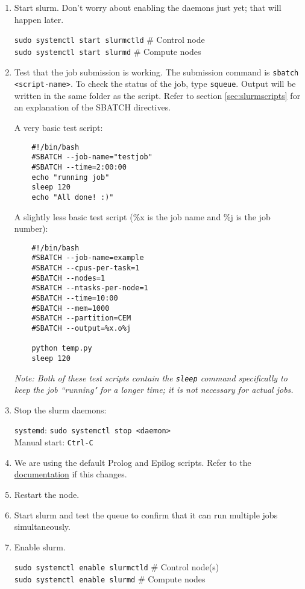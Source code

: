 \begin{enumerate}
\begin{enumerate}
	\end{enumerate}

\item Start slurm. Don't worry about enabling the daemons just yet; that will happen later.

	\texttt{sudo systemctl start slurmctld} \quad \# Control node \\
	\texttt{sudo systemctl start slurmd} \quad \# Compute nodes 

\item Test that the job submission is working. The submission command is \texttt{sbatch <script-name>}. To check the status of the job, type \texttt{squeue}. Output will be written in the same folder as the script. Refer to section \ref{sec:slurmscripts} for an explanation of the SBATCH directives.

A very basic test script:
\begin{verbatim}
	#!/bin/bash
	#SBATCH --job-name="testjob"
	#SBATCH --time=2:00:00
	echo "running job"
	sleep 120
	echo "All done! :)"
\end{verbatim}

A slightly less basic test script (\%x is the job name and \%j is the job number):
\begin{verbatim}
	#!/bin/bash
	#SBATCH --job-name=example
	#SBATCH --cpus-per-task=1
	#SBATCH --nodes=1
	#SBATCH --ntasks-per-node=1
	#SBATCH --time=10:00
	#SBATCH --mem=1000
	#SBATCH --partition=CEM
	#SBATCH --output=%x.o%j

	python temp.py
	sleep 120
\end{verbatim}

\emph{Note: Both of these test scripts contain the \emph{\texttt{sleep}} command specifically to keep the job ``running" for a longer time; it is not necessary for actual jobs.}

\item Stop the slurm daemons: 

	\texttt{systemd}: \texttt{sudo systemctl stop <daemon>} \\
	Manual start: \texttt{Ctrl-C}

\item We are using the default Prolog and Epilog scripts. Refer to the \href{https://slurm.schedmd.com/slurm.conf.html}{documentation} if this changes.

\item Restart the node.
	
\item Start slurm and test the queue to confirm that it can run multiple jobs simultaneously.

\item Enable slurm.

	\texttt{sudo systemctl enable slurmctld} \quad \# Control node(s) \\
	\texttt{sudo systemctl enable slurmd} \quad \# Compute nodes 
	
\end{enumerate}

